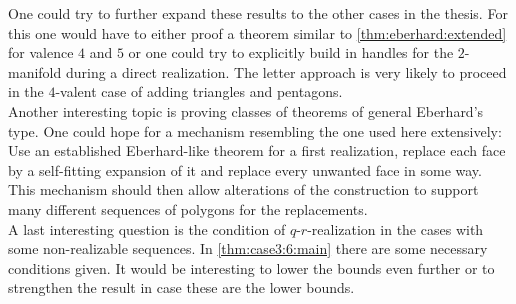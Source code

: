 One could try to further expand these results to the other cases in the thesis. For this one would have to either proof a theorem similar to \autoref{thm:eberhard:extended} for valence $4$ and $5$ or one could try to explicitly build in handles for the $2$-manifold during a direct realization. The letter approach is very likely to proceed in the $4$-valent case of adding triangles and pentagons.\\
Another interesting topic is proving classes of theorems of general Eberhard's type. One could hope for a mechanism resembling the one used here extensively: Use an established Eberhard-like theorem for a first realization, replace each face by a self-fitting expansion of it and replace every unwanted face in some way. This mechanism should then allow alterations of the construction to support many different sequences of polygons for the replacements. \\
A last interesting question is the condition of $q$-$r$-realization in the cases with some non-realizable sequences. In \autoref{thm:case3:6:main} there are some necessary conditions given. It would be interesting to lower the bounds even further or to strengthen the result in case these are the lower bounds.